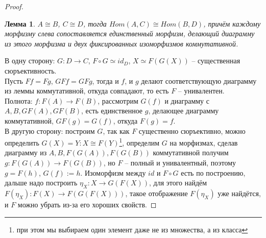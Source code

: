 \documentclass[a4paper]{article}
\theoremstyle{indented}
\newtheorem{lemma}{Лемма}
\theoremstyle{definition}
\theoremstyle{remark}
\begin{document}
\begin{proof}
\begin{lemma}
$A \cong B$, $C \cong D$, тогда $Hom(A, C) \cong Hom (B, D)$, причём каждому морфизму слева сопоставляется единственный морфизм, делающий  диаграмму из этого морфизма и двух фиксированных изоморфизмов коммутативной.
\end{lemma}
В одну сторону: $G: D \rightarrow C$, $F \circ G \simeq id_D$, $X \simeq F(G(X))$ -- существенная сюръективность.
\\Пусть $Ff = Fg$, $GFf = GFg$, тогда и $f$, и $g$ делают соответствующую диаграмму из леммы коммутативной, откуда совпадают, то есть $F$ -- унивалентен.
\\Полнота: $f: F(A) \rightarrow F(B)$, рассмотрим $G(f)$ и диаграмму с $A, B, GF(A), GF(B)$, есть единственное $g$, делающее диаграмму коммутативной, $GF(g) = G(f)$, откуда $F(g) = f$.
\\В другую сторону: построим $G$, так как $F$ существенно сюръективно, можно определить $G(X) = Y: X \cong F(Y)$\footnote{при этом мы выбираем один элемент даже не из множества, а из класса}, определим $G$ на морфизмах, сделав диаграмму из $A, B, F(G(A)), F(G(B))$ коммутативной получим $g: F(G(A)) \rightarrow F(G(B))$, но $F$ -- полный и унивалентный, поэтому $g = F(h)$, $G(f) := h$. Изоморфизм между $id$ и $F \circ G$ есть по построению, дальше надо построить $\eta_X: X \rightarrow G(F(X))$, для этого найдём $F(\eta_X): F(X) \rightarrow F(G(F(X)))$, такое отображение $F(\eta_X)$ уже найдётся, и $F$ можно убрать из-за его хороших свойств. 
\end{proof}
\end{document}
